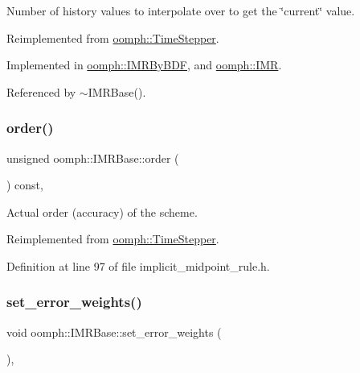 Number of history values to interpolate over to get the \char`\"{}current\char`\"{} value. 

Reimplemented from \hyperlink{classoomph_1_1TimeStepper_a5fcbef20161383c516ecdba4cf782106}{oomph\+::\+Time\+Stepper}.



Implemented in \hyperlink{classoomph_1_1IMRByBDF_a4fb7f902b1a266b19cfdfe640d4c78d5}{oomph\+::\+I\+M\+R\+By\+B\+DF}, and \hyperlink{classoomph_1_1IMR_a7cfe8ba542880aa524bcb837c1bc86e4}{oomph\+::\+I\+MR}.



Referenced by $\sim$\+I\+M\+R\+Base().

\mbox{\label{classoomph_1_1IMRBase_a8e556df579d73b46214f8993b2ff12d1}} 
\subsubsection{\texorpdfstring{order()}{order()}}
{\footnotesize\ttfamily unsigned oomph\+::\+I\+M\+R\+Base\+::order (\begin{DoxyParamCaption}{ }\end{DoxyParamCaption}) const\hspace{0.3cm}{\ttfamily [inline]}, {\ttfamily [virtual]}}



Actual order (accuracy) of the scheme. 



Reimplemented from \hyperlink{classoomph_1_1TimeStepper_a251e5d4b37381e582b7cf4c554e2e724}{oomph\+::\+Time\+Stepper}.



Definition at line 97 of file implicit\+\_\+midpoint\+\_\+rule.\+h.

\mbox{\label{classoomph_1_1IMRBase_a8122f3fa05e8622db6a98072d88685e2}} 
\subsubsection{\texorpdfstring{set\+\_\+error\+\_\+weights()}{set\_error\_weights()}}
{\footnotesize\ttfamily void oomph\+::\+I\+M\+R\+Base\+::set\+\_\+error\+\_\+weights (\begin{DoxyParamCaption}{ }\end{DoxyParamCaption})\hspace{0.3cm}{\ttfamily [inline]}, {\ttfamily [virtual]}}



